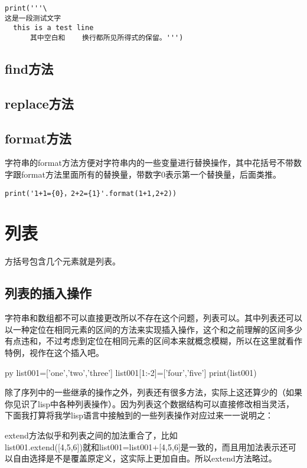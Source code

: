 \documentclass[12pt,oneside]{book}
\begin{document}
\begin{common-format}
\begin{Verbatim}
print('''\
这是一段测试文字
  this is a test line
      其中空白和    换行都所见所得式的保留。''')
\end{Verbatim}

\subsection{find方法}

\subsection{replace方法}


\subsection{format方法}
字符串的format方法方便对字符串内的一些变量进行替换操作，其中花括号不带数字跟format方法里面所有的替换量，带数字0表示第一个替换量，后面类推。
\begin{Verbatim}
print('1+1={0}，2+2={1}'.format(1+1,2+2))
\end{Verbatim}


\section{列表}
方括号包含几个元素就是列表。


\subsection{列表的插入操作}
\label{sec:列表插入操作}
字符串和数组都不可以直接更改所以不存在这个问题，列表可以。其中列表还可以以一种定位在相同元素的区间的方法来实现插入操作，这个和之前理解的区间多少有点违和，不过考虑到定位在相同元素的区间本来就概念模糊，所以在这里就看作特例，视作在这个插入吧。
\begin{xverbatim}[129]{py}
list001=['one','two','three']
list001[1:-2]=['four','five']
print(list001)
\end{xverbatim}

除了序列中的一些继承的操作之外，列表还有很多方法，实际上这还算少的（如果你见识了lisp中各种列表操作）。因为列表这个数据结构可以直接修改相当灵活，下面我打算将我学lisp语言中接触到的一些列表操作对应过来一一说明之：

extend方法似乎和列表之间的加法重合了，比如\\list001.extend([4,5,6])就和list001=list001+[4,5,6]是一致的，而且用加法表示还可以自由选择是不是覆盖原定义，这实际上更加自由。所以extend方法略过。


\end{common-format}
\end{document}
